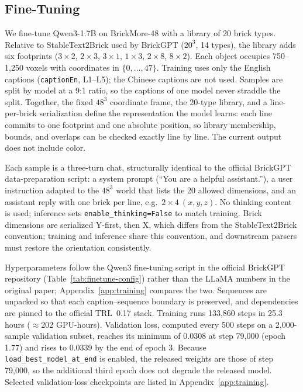 \documentclass[letterpaper]{article} %
\begin{document}
\subsection{Fine-Tuning}
\label{sec:training}
We fine-tune Qwen3-1.7B on BrickMore-48 with a library of 20 brick types. Relative to StableText2Brick used by BrickGPT ($20^3$, 14 types), the library adds six footprints ($3{\times}2$, $2{\times}3$, $3{\times}1$, $1{\times}3$, $2{\times}8$, $8{\times}2$). Each object occupies 750--1,250 voxels with coordinates in $\{0,\ldots,47\}$. Training uses only the English captions (\texttt{captionEn}, L1--L5); the Chinese captions are not used. Samples are split by model at a 9:1 ratio, so the captions of one model never straddle the split. Together, the fixed $48^3$ coordinate frame, the 20-type library, and a line-per-brick serialization define the representation the model learns: each line commits to one footprint and one absolute position, so library membership, bounds, and overlaps can be checked exactly line by line. The current output does not include color.

Each sample is a three-turn chat, structurally identical to the official BrickGPT data-preparation script: a system prompt (``You are a helpful assistant.''), a user instruction adapted to the $48^3$ world that lists the 20 allowed dimensions, and an assistant reply with one brick per line, e.g.\ $2{\times}4\ (x,y,z)$. No thinking content is used; inference sets \texttt{enable\_thinking=False} to match training. Brick dimensions are serialized Y-first, then X, which differs from the StableText2Brick convention; training and inference share this convention, and downstream parsers must restore the orientation consistently.

Hyperparameters follow the Qwen3 fine-tuning script in the official BrickGPT repository (Table~\ref{tab:finetune-config}) rather than the LLaMA numbers in the original paper; Appendix~\ref{app:training} compares the two. Sequences are unpacked so that each caption--sequence boundary is preserved, and dependencies are pinned to the official TRL~0.17 stack. Training runs 133,860 steps in 25.3 hours ($\approx$202 GPU-hours). Validation loss, computed every 500 steps on a 2,000-sample validation subset, reaches its minimum of 0.0308 at step 79,000 (epoch 1.77) and rises to 0.0339 by the end of epoch 3. Because \texttt{load\_best\_model\_at\_end} is enabled, the released weights are those of step 79,000, so the additional third epoch does not degrade the released model. Selected validation-loss checkpoints are listed in Appendix~\ref{app:training}.
\end{document}
